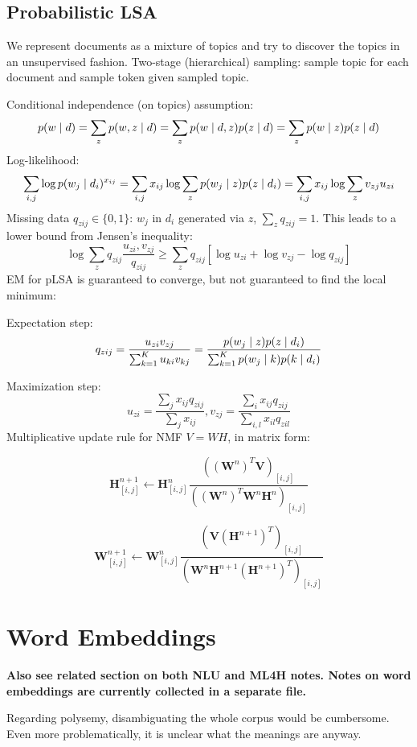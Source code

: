 \documentclass[12pt]{article}
\begin{document}
\subsection{Probabilistic LSA}
We represent documents as a mixture of topics and try to discover the topics in an unsupervised fashion. Two-stage (hierarchical) sampling: sample topic for each document and sample token given sampled topic.
\par Conditional independence (on topics) assumption:
\[ p(w\mid d) = \sum_z p(w,z\mid d) = \sum_z p(w\mid d,z) p(z\mid d) = \sum_z p(w\mid z) p(z\mid d) \]
Log-likelihood:
\[ \sum_{i,j} \log p(w_j\mid d_i)^{x_{ij}} = \sum_{i,j} x_{ij} \log \sum_z p(w_j\mid z) p(z\mid d_i) = \sum_{i,j} x_{ij} \log \sum_z v_{zj} u_{zi} \]
Missing data $q_{zij}\in\{ 0,1 \}$: $w_j$ in $d_i$ generated via $z$, $\sum_z q_{zij} = 1$. This leads to a lower bound from Jensen's inequality:
\[ \log \sum_z q_{zij} \frac{u_{zi}, v_{zj}}{q_{zij}} 
\geq \sum_z q_{zij} [ \log u_{zi} + \log v_{zj} - \log q_{zij} ] \]
EM for pLSA is guaranteed to converge, but not guaranteed to find the local minimum:
\ulb
\item Expectation step:
\[ q_{zij} = \frac{u_{zi}v_{zj}}{\sum_{k=1}^K u_{ki}v_{kj}} =
\frac{p(w_j\mid z) p(z\mid d_i)}{\sum_{k=1}^K p(w_j\mid k) p(k\mid d_i)} \]
\item Maximization step:
\[ u_{zi} = \frac{\sum_j x_{ij} q_{zij}}{\sum_j x_{ij}},
v_{zj} = \frac{\sum_i x_{ij} q_{zij}}{\sum_{i,l} x_{il} q_{zil}} \]
\ule
Multiplicative update rule for NMF $V = WH$, in matrix form:
\ulb
\item \[ \mathbf{H}_{[i,j]}^{n+1} \leftarrow \mathbf{H}_{[i,j]}^{n}
\frac{((\mathbf{W}^n)^T \mathbf{V})_{[i,j]}}{((\mathbf{W}^n)^T \mathbf{W}^n \mathbf{H}^n)_{[i,j]}} \]
\item \[ \mathbf{W}_{[i,j]}^{n+1} \leftarrow \mathbf{W}_{[i,j]}^{n}
\frac{(\mathbf{V}(\mathbf{H}^{n+1})^T)_{[i,j]}}{(\mathbf{W}^n \mathbf{H}^{n+1} (\mathbf{H}^{n+1})^T)_{[i,j]}} \]
\ule

\section{Word Embeddings}
\textbf{Also see related section on both NLU and ML4H notes.  Notes on word embeddings are currently collected in a separate file.}
\par Regarding polysemy, disambiguating the whole corpus would be cumbersome. Even more problematically, it is unclear what the meanings are anyway.
\end{document}
